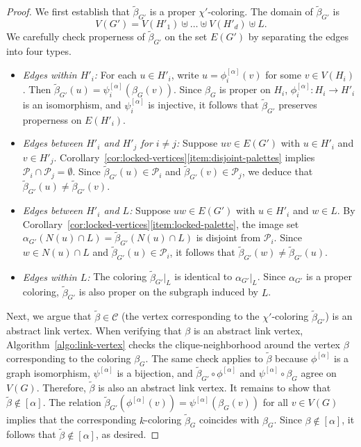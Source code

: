 \documentclass{amsart}
\theoremstyle{hypothesisstyle}
\theoremstyle{definition}
\theoremstyle{remark}
\numberwithin{equation}{section}
\begin{document}
\begin{proof}

We first establish that $\widetilde{\beta}_{G'}$ is a proper $\chi'$-coloring. The domain of $\widetilde{\beta}_{G'}$ is 
$$
V(G') = V(H'_1) \uplus \dots \uplus V(H'_{d})\uplus L.
$$
We carefully check properness of $\widetilde{\beta}_{G'}$ on the set $E(G')$ by separating the edges into four types.
\begin{itemize}
    \item \emph{Edges within $H'_{i}$:} For each $u\in H'_i$, write $u=\phi_i^{[\alpha]}(v)$ for some $v\in V(H_i)$. Then $\widetilde{\beta}_{G'}(u)=\psi_i^{[\alpha]}(\beta_G(v))$. Since $\beta_G$ is proper on $H_i$, $\phi_i^{[\alpha]}\colon H_i\to H'_i$ is an isomorphism, and $\psi_i^{[\alpha]}$ is injective, it follows that $\widetilde{\beta}_{G'}$ preserves properness on $E(H'_i)$.
    \item \emph{Edges between $H'_{i}$ and $H'_{j}$ for $i\neq j$:} Suppose $uv\in E(G')$ with $u\in H'_i$ and $v\in H'_j$. Corollary~\ref{cor:locked-vertices}\eqref{item:disjoint-palettes} implies $\mathcal P_{i}\cap \mathcal P_{j}=\emptyset$. Since $\widetilde{\beta}_{G'}(u)\in \mathcal P_{i}$ and $\widetilde{\beta}_{G'}(v)\in \mathcal P_{j}$, we deduce that $\widetilde{\beta}_{G'}(u)\neq \widetilde{\beta}_{G'}(v)$. 
    \item \emph{Edges between $H'_{i}$ and $L$:} Suppose $uw\in E(G')$ with $u\in H'_{i}$ and $w\in L$. By Corollary~\ref{cor:locked-vertices}\eqref{item:locked-palette}, the image set $\alpha_{G'}(N(u)\cap L)=\widetilde{\beta}_{G'}(N(u)\cap L)$ is disjoint from $\mathcal{P}_{i}$. Since $w\in N(u)\cap L$ and $\widetilde{\beta}_{G'}(u)\in \mathcal{P}_{i}$, it follows that $\widetilde{\beta}_{G'}(w)\neq \widetilde{\beta}_{G'}(u)$.
    \item \emph{Edges within $L$:} The coloring $\widetilde{\beta}_{G'}|_{L}$ is identical to $\alpha_{G'}|_{L}$. Since $\alpha_{G'}$ is a proper coloring, $\widetilde{\beta}_{G'}$ is also proper on the subgraph induced by $L$.
\end{itemize}
Next, we argue that $\widetilde{\beta}\in \mathcal{C}$ (the vertex corresponding to the $\chi'$-coloring $\widetilde{\beta}_{G'}$) is an abstract link vertex. When verifying that $\beta$ is an abstract link vertex, Algorithm~\ref{algo:link-vertex} checks the clique-neighborhood around the vertex $\beta$ corresponding to the coloring $\beta_G$. The same check applies to $\widetilde{\beta}$ because $\phi^{[\alpha]}$ is a graph isomorphism, $\psi^{[\alpha]}$ is a bijection, and $\widetilde{\beta}_{G'}\circ \phi^{[\alpha]}$ and $\psi^{[\alpha]}\circ \beta_{G}$ agree on $V(G)$. Therefore, $\widetilde{\beta}$ is also an abstract link vertex. It remains to show that $\widetilde{\beta}\notin[\alpha]$. The relation $\widetilde{\beta}_{G'}(\phi^{[\alpha]}(v))=\psi^{[\alpha]}(\beta_G(v))$ for all $v\in V(G)$ implies that the corresponding $k$-coloring $\widetilde{\beta}_{G}$ coincides with $\beta_{G}$. Since $\beta\notin [\alpha]$, it follows that $\widetilde{\beta}\notin [\alpha]$, as desired. \end{proof}
\end{document}
